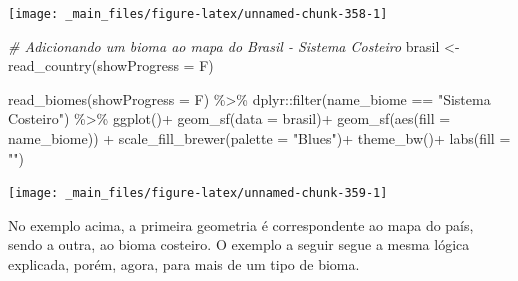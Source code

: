 \documentclass[
  brazilian,
]{book}
\newenvironment{Shaded}{\begin{snugshade}}{\end{snugshade}}
\newcommand{\AttributeTok}[1]{\textcolor[rgb]{0.77,0.63,0.00}{#1}}
\newcommand{\CommentTok}[1]{\textcolor[rgb]{0.56,0.35,0.01}{\textit{#1}}}
\newcommand{\FunctionTok}[1]{\textcolor[rgb]{0.00,0.00,0.00}{#1}}
\newcommand{\NormalTok}[1]{#1}
\newcommand{\OtherTok}[1]{\textcolor[rgb]{0.56,0.35,0.01}{#1}}
\newcommand{\SpecialCharTok}[1]{\textcolor[rgb]{0.00,0.00,0.00}{#1}}
\newcommand{\StringTok}[1]{\textcolor[rgb]{0.31,0.60,0.02}{#1}}
\begin{document}
\begin{center}\texttt{[image: \_main\_files/figure-latex/unnamed-chunk-358-1]} \end{center}

\begin{Shaded}
\begin{Highlighting}[]
\CommentTok{\# Adicionando um bioma ao mapa do Brasil {-} Sistema Costeiro}
\NormalTok{brasil }\OtherTok{\textless{}{-}} \FunctionTok{read\_country}\NormalTok{(}\AttributeTok{showProgress =}\NormalTok{ F)}

\FunctionTok{read\_biomes}\NormalTok{(}\AttributeTok{showProgress =}\NormalTok{ F) }\SpecialCharTok{\%\textgreater{}\%} 
\NormalTok{  dplyr}\SpecialCharTok{::}\FunctionTok{filter}\NormalTok{(name\_biome }\SpecialCharTok{==} \StringTok{"Sistema Costeiro"}\NormalTok{) }\SpecialCharTok{\%\textgreater{}\%} 
  \FunctionTok{ggplot}\NormalTok{()}\SpecialCharTok{+}
  \FunctionTok{geom\_sf}\NormalTok{(}\AttributeTok{data =}\NormalTok{ brasil)}\SpecialCharTok{+}
  \FunctionTok{geom\_sf}\NormalTok{(}\FunctionTok{aes}\NormalTok{(}\AttributeTok{fill =}\NormalTok{ name\_biome)) }\SpecialCharTok{+}
  \FunctionTok{scale\_fill\_brewer}\NormalTok{(}\AttributeTok{palette =} \StringTok{"Blues"}\NormalTok{)}\SpecialCharTok{+}
  \FunctionTok{theme\_bw}\NormalTok{()}\SpecialCharTok{+}
  \FunctionTok{labs}\NormalTok{(}\AttributeTok{fill =} \StringTok{""}\NormalTok{)}
\end{Highlighting}
\end{Shaded}

\begin{center}\texttt{[image: \_main\_files/figure-latex/unnamed-chunk-359-1]} \end{center}

No exemplo acima, a primeira geometria é correspondente ao mapa do país, sendo a outra, ao bioma costeiro. O exemplo a seguir segue a mesma lógica explicada, porém, agora, para mais de um tipo de bioma.
\end{document}
